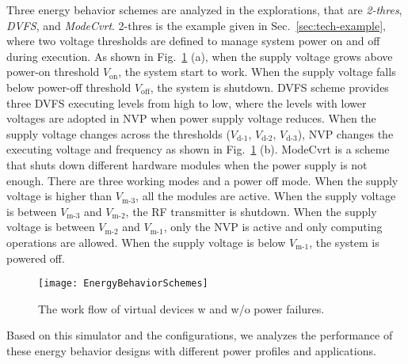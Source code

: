 Three energy behavior schemes are analyzed in the explorations, that are \emph{2-thres}, \emph{DVFS}, and \emph{ModeCvrt}.
2-thres  is the example given in Sec.~\ref{sec:tech-example}, where two voltage thresholds are defined to manage system power on and off during execution.
As shown in Fig.~\ref{fig:EnergyBehaviorSchemes} (a), when the supply voltage grows above power-on threshold $V_{\text{on}}$, the system start to work.
When the supply voltage falls below power-off threshold $V_{\text{off}}$, the system is shutdown.
DVFS scheme provides three DVFS executing levels from high to low, where the levels with lower voltages are adopted in NVP when power supply voltage reduces. 
When the supply voltage changes across the thresholds ($V_{\text{d-1}}$, $V_{\text{d-2}}$, $V_{\text{d-3}}$), NVP changes the executing voltage and frequency as shown in Fig.~\ref{fig:EnergyBehaviorSchemes} (b).
ModeCvrt is a scheme that shuts down different hardware modules when the power supply is not enough.
There are three working modes and a power off mode.
When the supply voltage is higher than $V_{\text{m-3}}$, all the modules are active.
When the supply voltage is between $V_{\text{m-3}}$ and $V_{\text{m-2}}$, the RF transmitter is shutdown.
When the supply voltage is between $V_{\text{m-2}}$ and $V_{\text{m-1}}$, only the NVP is active and only computing operations are allowed.
When the supply voltage is below $V_{\text{m-1}}$, the system is powered off.




\begin{figure}[htpb]
	\centering
	\texttt{[image: EnergyBehaviorSchemes]}
	\vspace{-20pt}
	\caption{The work flow of virtual devices w and w/o power failures.}	\label{fig:EnergyBehaviorSchemes}
	\vspace{-5pt}
\end{figure}

Based on this simulator and the configurations, we analyzes the performance of these energy behavior designs with different power profiles and applications. 


